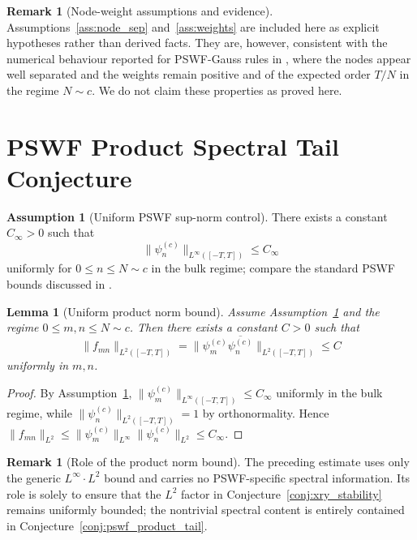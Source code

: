 \documentclass[12pt,a4paper]{amsart}
\newtheorem{lemma}[theorem]{Lemma}
\theoremstyle{definition}
\newtheorem{remark}[theorem]{Remark}
\newtheorem{assumption}[theorem]{Assumption}
\newcommand{\norm}[1]{\|#1\|}
\begin{document}
\begin{remark}[Node-weight assumptions and evidence]\label{rem:nodes_weights_evidence}
Assumptions~\ref{ass:node_sep} and~\ref{ass:weights} are included here as
explicit hypotheses rather than derived facts. They are, however,
consistent with the numerical behaviour reported for PSWF-Gauss rules in
\cite{Xiao2001,OsipovRokhlinXiao}, where the nodes appear well separated and
the weights remain positive and of the expected order $T/N$ in the regime
$N\sim c$. We do not claim these properties as proved here.
\end{remark}

\section{PSWF Product Spectral Tail Conjecture}\label{sec:spectral_decay}

\begin{assumption}[Uniform PSWF sup-norm control]\label{ass:pswf_sup}
There exists a constant $C_{\infty}>0$ such that
\[
  \norm{\psi_n^{(c)}}_{L^\infty([-T,T])}\le C_{\infty}
\]
uniformly for $0\le n\le N\sim c$ in the bulk regime; compare the standard
PSWF bounds discussed in \cite{Slepian1978,OsipovRokhlinXiao}.
\end{assumption}

\begin{lemma}[Uniform product norm bound]\label{lem:product_norm}
Assume Assumption~\ref{ass:pswf_sup} and the regime $0\le m,n\le N\sim c$.
Then there exists a constant $C>0$ such that
\[
  \norm{f_{mn}}_{L^2([-T,T])}
  = \norm{\psi_m^{(c)}\overline{\psi_n^{(c)}}}_{L^2([-T,T])}
  \le C
\]
uniformly in $m,n$.
\end{lemma}
\begin{proof}
By Assumption~\ref{ass:pswf_sup},
$\norm{\psi_m^{(c)}}_{L^\infty([-T,T])}\le C_{\infty}$ uniformly in the
bulk regime, while $\norm{\psi_n^{(c)}}_{L^2([-T,T])}=1$ by orthonormality.
Hence
$\norm{f_{mn}}_{L^2}
  \le \norm{\psi_m^{(c)}}_{L^\infty}\norm{\psi_n^{(c)}}_{L^2}
  \le C_{\infty}.$
\end{proof}

\begin{remark}[Role of the product norm bound]\label{rem:generic_bound}
The preceding estimate uses only the generic $L^\infty\cdot L^2$ bound and
carries no PSWF-specific spectral information. Its role is solely to ensure
that the $L^2$ factor in Conjecture~\ref{conj:xry_stability} remains
uniformly bounded; the nontrivial spectral content is entirely contained in
Conjecture~\ref{conj:pswf_product_tail}.
\end{remark}
\end{document}
